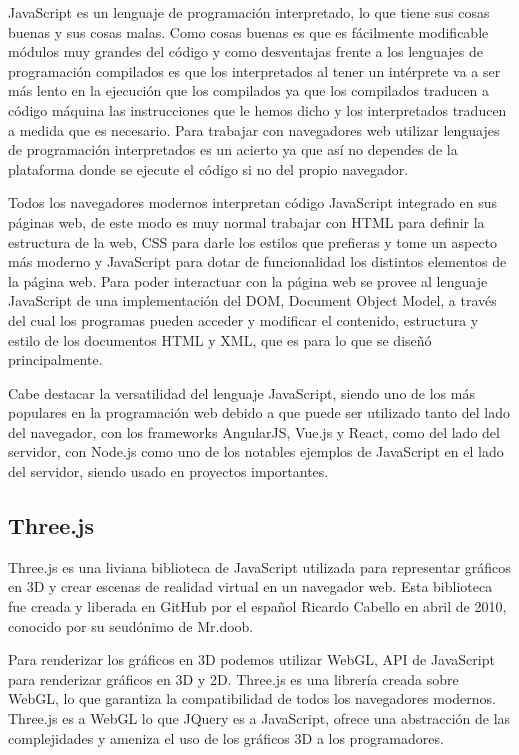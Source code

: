 \documentclass[a4paper, 12pt]{book}
\begin{document}
JavaScript es un lenguaje de programación interpretado, lo que tiene sus cosas buenas y sus cosas malas. Como cosas buenas es que es fácilmente modificable módulos muy grandes del código y como desventajas frente a los lenguajes de programación compilados es que los interpretados al tener un intérprete va a ser más lento en la ejecución que los compilados ya que los compilados traducen a código máquina las instrucciones que le hemos dicho y los interpretados traducen a medida que es necesario. Para trabajar con navegadores web utilizar lenguajes de programación interpretados es un acierto ya que así no dependes de la plataforma donde se ejecute el código si no del propio navegador.

Todos los navegadores modernos interpretan código JavaScript integrado en sus páginas web, de este modo es muy normal trabajar con HTML para definir la estructura de la web, CSS para darle los estilos que prefieras y tome un aspecto más moderno y JavaScript para dotar de funcionalidad los distintos elementos de la página web. Para poder interactuar con la página web se provee al lenguaje JavaScript de una implementación del DOM, Document Object Model, a través del cual los programas pueden acceder y modificar el contenido, estructura y estilo de los documentos HTML y XML, que es para lo que se diseñó principalmente.

Cabe destacar la versatilidad del lenguaje JavaScript, siendo uno de los más populares en la programación web debido a que puede ser utilizado tanto del lado del navegador, con los frameworks AngularJS, Vue.js y React, como del lado del servidor, con Node.js como uno de los notables ejemplos de JavaScript en el lado del servidor, siendo usado en proyectos importantes.
\subsection{ Three.js} 
\label{sec:three}

Three.js es una liviana biblioteca de JavaScript utilizada para representar gráficos en 3D y crear escenas de realidad virtual en un navegador web. Esta biblioteca fue creada y liberada en GitHub por el español Ricardo Cabello en abril de 2010, conocido por su seudónimo de Mr.doob.

Para renderizar los gráficos en 3D podemos utilizar WebGL, API de JavaScript para renderizar gráficos en 3D y 2D. Three.js es una librería creada sobre WebGL, lo que garantiza la compatibilidad de todos los navegadores modernos. Three.js es a WebGL lo que JQuery es a JavaScript, ofrece una abstracción de las complejidades y ameniza el uso de los gráficos 3D a los programadores.
\end{document}
